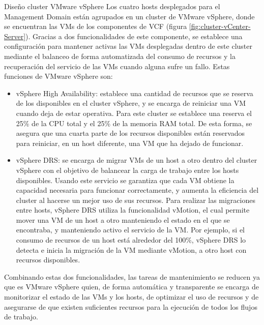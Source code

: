 \begin{subsubsection}{Diseño cluster VMware vSphere}
\label{subsubsec:diseno-vsphere}
Los cuatro hosts desplegados para el Management Domain están agrupados en un cluster de VMware vSphere, donde se encuentran las VMs de los componentes de VCF (figura \ref{fig:cluster-vCenter-Server}). Gracias a dos funcionalidades de este componente, se establece una configuración para mantener activas las VMs desplegadas dentro de este cluster mediante el balanceo de forma automatizada del consumo de recursos y la recuperación del servicio de las VMs cuando alguna sufre un fallo. Estas funciones de VMware vSphere son:
\begin{itemize}
  \item vSphere High Availability: establece una cantidad de recursos que se reserva de los disponibles en el cluster vSphere, y se encarga de reiniciar una VM cuando deja de estar operativa. Para este cluster se establece una reserva el 25\% de la CPU total y el 25\% de la memoria RAM total. De esta forma, se asegura que una cuarta parte de los recursos disponibles están reservados para reiniciar, en un host diferente, una VM que ha dejado de funcionar.
  
  \item vSphere DRS: se encarga de migrar VMs de un host a otro dentro del cluster vSphere con el objetivo de balancear la carga de trabajo entre los hosts disponibles. Usando este servicio se garantiza que cada VM obtiene la capacidad necesaria para funcionar correctamente, y aumenta la eficiencia del cluster al hacerse un mejor uso de sus recursos. Para realizar las migraciones entre hosts, vSphere DRS utiliza la funcionalidad vMotion, el cual permite mover una VM de un host a otro manteniendo el estado en el que se encontraba, y manteniendo activo el servicio de la VM. Por ejemplo, si el consumo de recursos de un host está alrededor del 100\%, vSphere DRS lo detecta e inicia la migración de la VM mediante vMotion, a otro host con recursos disponibles. 
\end{itemize}

Combinando estas dos funcionalidades, las tareas de mantenimiento se reducen ya que es VMware vSphere quien, de forma automática y transparente se encarga de monitorizar el estado de las VMs y los hosts, de optimizar el uso de recursos y de asegurarse de que existen suficientes recursos para la ejecución de todos los flujos de trabajo.


\end{subsubsection}
